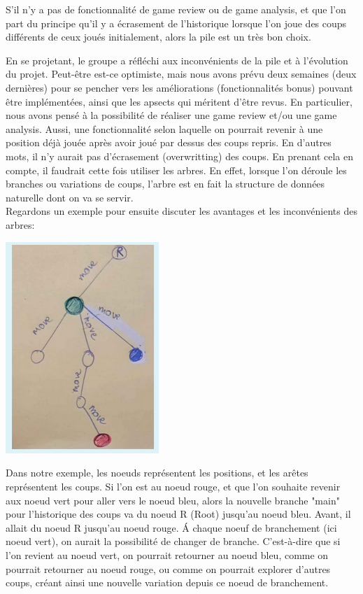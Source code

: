 \documentclass{article}
\begin{document}
S'il n'y a pas de fonctionnalité de game review ou de game analysis, et que l'on part du principe qu'il y a écrasement de l'historique
lorsque l'on joue des coups différents de ceux joués initialement, alors la pile est un très bon choix.\\

\par En se projetant, le groupe a réfléchi aux inconvénients de la pile et à l'évolution du projet.
Peut-être est-ce optimiste, mais nous avons prévu deux semaines (deux dernières) pour se pencher vers les améliorations
(fonctionnalités bonus) pouvant être implémentées, ainsi que les apsects qui méritent d'être revus. En particulier, nous avons
pensé à la possibilité de réaliser une game review et/ou une game analysis. Aussi, une fonctionnalité selon laquelle on pourrait 
revenir à une position déjà jouée après avoir joué par dessus des coups repris. En d'autres mots, il n'y aurait pas d'écrasement
(overwritting) des coups.
En prenant cela en compte, il faudrait cette fois utiliser les arbres. En effet, lorsque l'on déroule les branches ou variations de coups,
l'arbre est en fait la structure de données naturelle dont on va se servir.\\
Regardons un exemple pour ensuite discuter les avantages et les inconvénients des arbres:\\
\begin{center}
    \includegraphics[height=8.0cm]{arbres-branchement-coups.png}
\end{center}

Dans notre exemple, les noeuds représentent les positions,
et les arêtes représentent les coups. Si l'on est au noeud rouge, et que l'on souhaite revenir aux noeud vert pour aller vers le noeud bleu,
alors la nouvelle branche "main" pour l'historique des coups va du noeud R (Root) jusqu'au noeud bleu. Avant, il allait du noeud R jusqu'au
noeud rouge. \'A chaque noeuf de branchement (ici noeud vert), on aurait la possibilité de changer de branche. C'est-à-dire que si l'on revient
au noeud vert, on pourrait retourner au noeud bleu, comme on pourrait retourner au noeud rouge, ou comme on pourrait explorer d'autres coups,
créant ainsi une nouvelle variation depuis ce noeud de branchement.
\end{document}
